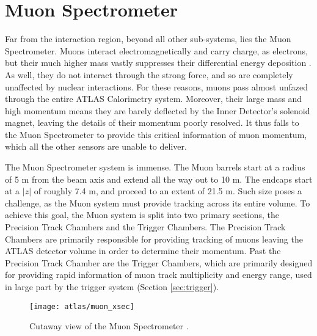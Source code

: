     


\section{Muon Spectrometer} \label{sec:muon}

    Far from the interaction region, beyond all other sub-systems, lies the Muon Spectrometer.
    Muons interact electromagnetically and carry charge, as electrons, but their much higher mass vastly suppresses their differential energy deposition \cite{wiley_radiation_detection}.
    As well, they do not interact through the strong force, and so are completely unaffected by nuclear interactions.
    For these reasons, muons pass almost unfazed through the entire ATLAS Calorimetry system.
    Moreover, their large mass and high momentum means they are barely deflected by the Inner Detector's solenoid magnet,
        leaving the details of their momentum poorly resolved.
    It thus falls to the Muon Spectrometer to provide this critical information of muon momentum, which all the other sensors are unable to deliver.

    The Muon Spectrometer system is immense.
    The Muon barrels start at a radius of 5 m from the beam axis and extend all the way out to 10 m.
    The endcaps start at a $|z|$ of roughly 7.4 m, and proceed to an extent of 21.5 m.
    Such size poses a challenge, as the Muon system must provide tracking across its entire volume.
    To achieve this goal, the Muon system is split into two primary sections, the Precision Track Chambers and the Trigger Chambers.
    The Precision Track Chambers are primarily responsible for providing tracking of muons leaving the ATLAS detector volume in order to determine their momentum.
    Past the Precision Track Chamber are the Trigger Chambers, which are primarily designed for providing rapid information of muon track multiplicity and energy range, used in large part by the trigger system (Section \ref{sec:trigger}).

    \begin{figure}
        \texttt{[image: atlas/muon\_xsec]}
        \caption{Cutaway view of the Muon Spectrometer \cite{atlas_tdr}.}
        \label{fig:muon_xsec}
    \end{figure}

